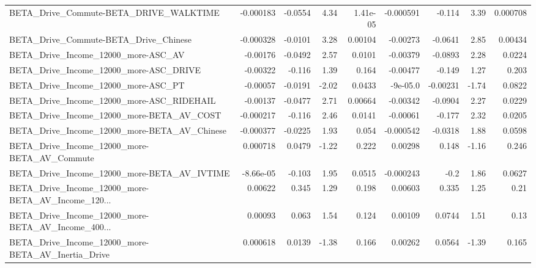 \begin{tabular}{lrrrrrrrr}
BETA\_Drive\_Commute-BETA\_DRIVE\_WALKTIME             &   -0.000183 &      -0.0554 &     4.34 & 1.41e-05 &  -0.000591 &      -0.114 &         3.39 &      0.000708 \\
BETA\_Drive\_Commute-BETA\_Drive\_Chinese              &   -0.000328 &      -0.0101 &     3.28 &  0.00104 &   -0.00273 &     -0.0641 &         2.85 &       0.00434 \\
BETA\_Drive\_Income\_12000\_more-ASC\_AV                &    -0.00176 &      -0.0492 &     2.57 &   0.0101 &   -0.00379 &     -0.0893 &         2.28 &        0.0224 \\
BETA\_Drive\_Income\_12000\_more-ASC\_DRIVE             &    -0.00322 &       -0.116 &     1.39 &    0.164 &   -0.00477 &      -0.149 &         1.27 &         0.203 \\
BETA\_Drive\_Income\_12000\_more-ASC\_PT                &    -0.00057 &      -0.0191 &    -2.02 &   0.0433 &   -9e-05.0 &    -0.00231 &        -1.74 &        0.0822 \\
BETA\_Drive\_Income\_12000\_more-ASC\_RIDEHAIL          &    -0.00137 &      -0.0477 &     2.71 &  0.00664 &   -0.00342 &     -0.0904 &         2.27 &        0.0229 \\
BETA\_Drive\_Income\_12000\_more-BETA\_AV\_COST          &   -0.000217 &       -0.116 &     2.46 &   0.0141 &   -0.00061 &      -0.177 &         2.32 &        0.0205 \\
BETA\_Drive\_Income\_12000\_more-BETA\_AV\_Chinese       &   -0.000377 &      -0.0225 &     1.93 &    0.054 &  -0.000542 &     -0.0318 &         1.88 &        0.0598 \\
BETA\_Drive\_Income\_12000\_more-BETA\_AV\_Commute       &    0.000718 &       0.0479 &    -1.22 &    0.222 &    0.00298 &       0.148 &        -1.16 &         0.246 \\
BETA\_Drive\_Income\_12000\_more-BETA\_AV\_IVTIME        &   -8.66e-05 &       -0.103 &     1.95 &   0.0515 &  -0.000243 &        -0.2 &         1.86 &        0.0627 \\
BETA\_Drive\_Income\_12000\_more-BETA\_AV\_Income\_120... &     0.00622 &        0.345 &     1.29 &    0.198 &    0.00603 &       0.335 &         1.25 &          0.21 \\
BETA\_Drive\_Income\_12000\_more-BETA\_AV\_Income\_400... &     0.00093 &        0.063 &     1.54 &    0.124 &    0.00109 &      0.0744 &         1.51 &          0.13 \\
BETA\_Drive\_Income\_12000\_more-BETA\_AV\_Inertia\_Drive &    0.000618 &       0.0139 &    -1.38 &    0.166 &    0.00262 &      0.0564 &        -1.39 &         0.165 \\

\end{tabular}
